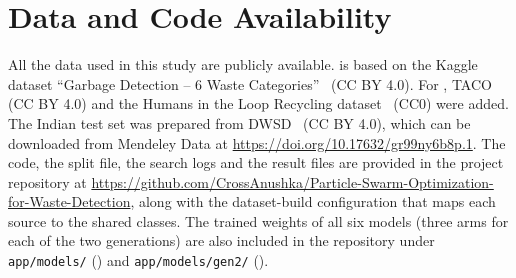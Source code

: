 \section*{Data and Code Availability}
All the data used in this study are publicly available. \genone is based on the Kaggle dataset ``Garbage Detection -- 6 Waste Categories''~\cite{viswaprakash2024garbage} (CC BY 4.0). For \gentwo, TACO~\cite{proenca2020taco} (CC BY 4.0) and the Humans in the Loop Recycling dataset~\cite{hitl2026recycling} (CC0) were added. The Indian test set was prepared from DWSD~\cite{ali2025dwsd} (CC BY 4.0), which can be downloaded from Mendeley Data at \url{https://doi.org/10.17632/gr99ny6b8p.1}. The code, the split file, the search logs and the result files are provided in the project repository at \url{https://github.com/CrossAnushka/Particle-Swarm-Optimization-for-Waste-Detection}, along with the dataset-build configuration that maps each source to the shared classes. The trained weights of all six models (three arms for each of the two generations) are also included in the repository under \texttt{app/models/} (\genone) and \texttt{app/models/gen2/} (\gentwo).
